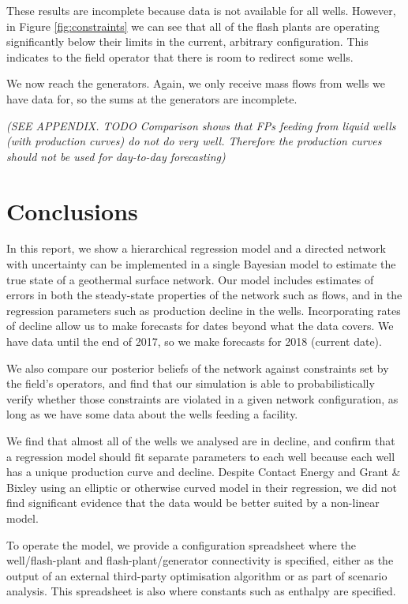\documentclass[a4paper, 12pt]{article}
\begin{document}
These results are incomplete because data is not available for all wells. However, in Figure \ref{fig:constraints} we can see that all of the flash plants are operating significantly below their limits in the current, arbitrary configuration. This indicates to the field operator that there is room to redirect some wells.

We now reach the generators. Again, we only receive mass flows from wells we have data for, so the sums at the generators are incomplete.

\emph{(SEE APPENDIX. TODO Comparison shows that FPs feeding from liquid wells (with production curves) do not do very well. Therefore the production curves should not be used for day-to-day forecasting)}

\section{Conclusions}
In this report, we show a hierarchical regression model and a directed network with uncertainty can be implemented in a single Bayesian model to estimate the true state of a geothermal surface network. Our model includes estimates of errors in both the steady-state properties of the network such as flows, and in the regression parameters such as production decline in the wells. Incorporating rates of decline allow us to make forecasts for dates beyond what the data covers. We have data until the end of 2017, so we make forecasts for 2018 (current date).

We also compare our posterior beliefs of the network against constraints set by the field's operators, and find that our simulation is able to probabilistically verify whether those constraints are violated in a given network configuration, as long as we have some data about the wells feeding a facility.

We find that almost all of the wells we analysed are in decline, and confirm that a regression model should fit separate parameters to each well because each well has a unique production curve and decline. Despite Contact Energy and Grant \& Bixley using an elliptic or otherwise curved model in their regression, we did not find significant evidence that the data would be better suited by a non-linear model.

To operate the model, we provide a configuration spreadsheet where the well/flash-plant and flash-plant/generator connectivity is specified, either as the output of an external third-party optimisation algorithm or as part of scenario analysis. This spreadsheet is also where constants such as enthalpy are specified.
\end{document}
